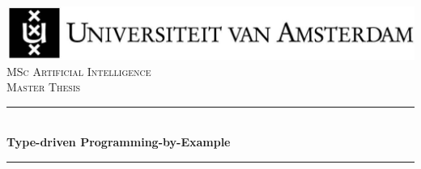 
\newcommand{\red}[1]{{\color{red}{#1}}}




\begin{titlepage}

\newcommand{\HRule}{\rule{\linewidth}{0.5mm}} %
\center %
 

\includegraphics[width=\linewidth]{figures/uva.jpg}\\[2.5cm]
\textsc{\Large MSc Artificial Intelligence}\\[0.2cm]
\textsc{\Large Master Thesis}\\[0.5cm] 


\HRule \\[0.4cm]
{ \huge \bfseries
    Type-driven Programming-by-Example \\
}%
\HRule \\[0.5cm]
 


\end{titlepage}
